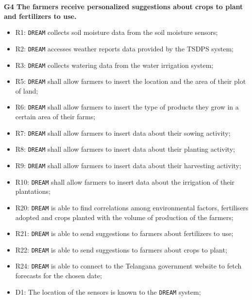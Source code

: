 \documentclass{article}
\begin{document}
\vspace{5mm}
\textbf{G4 The farmers receive personalized suggestions about crops to plant and fertilizers to use.}
\begin{itemize}
    \item R1: \verb|DREAM| collects soil moisture data from the soil moisture sensors;
    \item R2: \verb|DREAM| accesses weather reports data provided by the TSDPS system;

    \item R3: \verb|DREAM| collects watering data from the water irrigation system;

    \item R5: \verb|DREAM| shall allow farmers to insert the location and the area of their plot of land;

    \item R6: \verb|DREAM| shall allow farmers to insert the type of products they grow in a certain area of their farms;

    \item R7: \verb|DREAM| shall allow farmers to insert data about their sowing activity;

    \item R8: \verb|DREAM| shall allow farmers to insert data about their planting activity;
    
    \item R9: \verb|DREAM| shall allow farmers to insert data about their harvesting activity;
    
    \item R10: \verb|DREAM| shall allow farmers to insert data about the irrigation of their plantations;
    
    \item R20: \verb|DREAM| is able to find correlations among environmental factors, fertilisers adopted and crops planted with the volume of production of the farmers;
 
    \item R21: \verb|DREAM| is able to send suggestions to farmers about fertilizers to use;
    
    \item R22: \verb|DREAM| is able to send suggestions to farmers about crops to plant; 
 
    \item R24: \verb|DREAM| is able to connect to the Telangana government website to fetch forecasts for the chosen date;
    
    \item D1: The location of the sensors is known to the \verb|DREAM| system;
    

\end{itemize}
\end{document}
